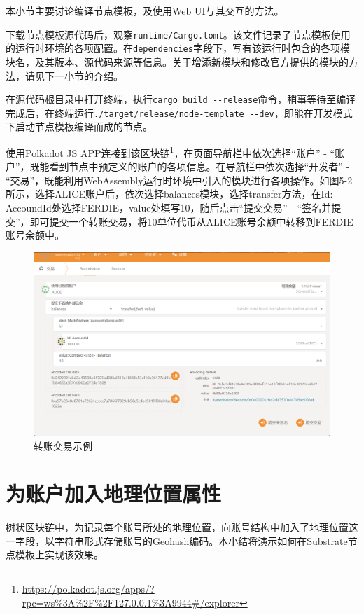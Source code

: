 本小节主要讨论编译节点模板，及使用Web UI与其交互的方法。

下载节点模板源代码后，观察\verb|runtime/Cargo.toml|。该文件记录了节点模板使用的运行时环境的各项配置。在\verb|dependencies|字段下，写有该运行时包含的各项模块名，及其版本、源代码来源等信息。关于增添新模块和修改官方提供的模块的方法，请见下一小节的介绍。

在源代码根目录中打开终端，执行\verb|cargo build --release|命令，稍事等待至编译完成后，在终端运行\verb|./target/release/node-template --dev|，即能在开发模式下启动节点模板编译而成的节点。

使用Polkadot JS APP连接到该区块链\footnote{\url{https://polkadot.js.org/apps/?rpc=ws\%3A\%2F\%2F127.0.0.1\%3A9944\#/explorer}}，在页面导航栏中依次选择“账户” - “账户”，既能看到节点中预定义的账户的各项信息。在导航栏中依次选择“开发者” - “交易”，既能利用WebAssembly运行时环境中引入的模块进行各项操作。如图5-2所示，选择ALICE账户后，依次选择balances模块，选择transfer方法，在Id: AccoundId处选择FERDIE，value处填写10，随后点击“提交交易” - “签名并提交”，即可提交一个转账交易，将10单位代币从ALICE账号余额中转移到FERDIE账号余额中。

\begin{figure}[htbp]
    \centering
    \includegraphics[width=\textwidth]{images/substrateTransfer.png}
    \caption{转账交易示例}\label{转账交易示例} %
\end{figure}

\section{为账户加入地理位置属性}

树状区块链中，为记录每个账号所处的地理位置，向账号结构中加入了地理位置这一字段，以字符串形式存储账号的Geohash编码。本小结将演示如何在Substrate节点模板上实现该效果。


